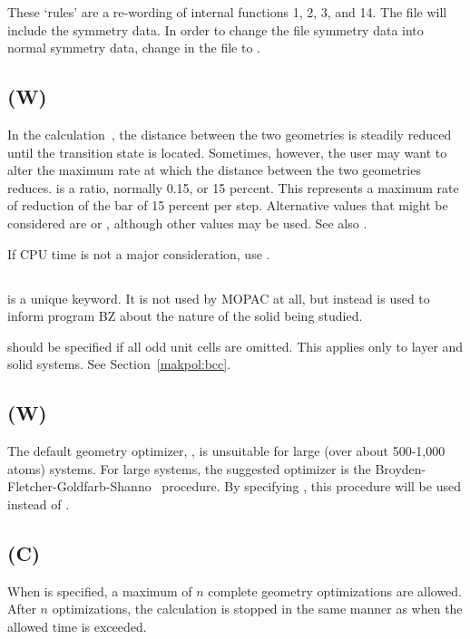 These `rules' are a re-wording of internal  functions 1, 2, 3,
and 14.  The  file will include the symmetry data.  In order to
change the  file symmetry data into normal symmetry data, change
 in the  file to .

\subsection*{ (W)}
In the  calculation~\cite{saddle}, the distance between the two
geometries is steadily  reduced  until  the  transition  state  is located.
Sometimes, however, the user may want  to  alter  the  maximum  rate  at
which  the distance  between  the  two geometries reduces.  is a ratio,
normally 0.15, or 15 percent.  This represents a maximum rate of reduction of
the bar  of 15 percent per step.  Alternative values that might be considered
are  or , although other values may  be  used.
See  also .

If CPU time is not a major consideration, use .

\subsection*{}
 is a unique keyword. It is not used by MOPAC at all, but instead is
used to inform program BZ about the nature of the solid being studied.

 should be specified if all odd unit cells are omitted.  This applies
only to layer and solid systems.  See Section~\ref{makpol:bcc}.

\subsection*{ (W)}
The default geometry optimizer, , is unsuitable for large (over  about
500-1,000 atoms) systems. For large systems, the suggested optimizer is the
Broyden-Fletcher-Goldfarb-Shanno~\cite{bfgs1,bfgs2,bfgs3,bfgs4} procedure.  By
specifying , this procedure will be used instead of .

\subsection*{ (C)}
When  is specified, a maximum of $n$ complete geometry
optimizations are allowed.  After $n$ optimizations, the calculation is
stopped in the same manner as when the allowed time is exceeded.

